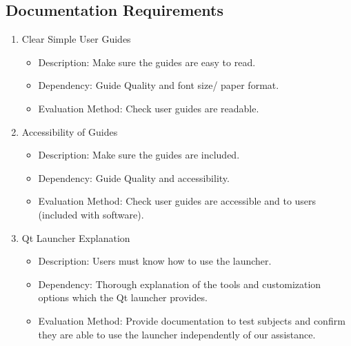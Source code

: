 \documentclass[a4paper,10pt]{article}
\begin{document}
	\subsection{Documentation Requirements}
	\begin{enumerate}
	  \item Clear Simple User Guides
	  \begin{itemize}
	    \item Description: Make sure the guides are easy to read.
	    \item  Dependency: Guide Quality and font size/ paper format.
	    \item Evaluation Method: Check user guides are readable.
	  \end{itemize}
	\item Accessibility of Guides
	  \begin{itemize}
	    \item Description: Make sure the guides are included.
	    \item  Dependency: Guide Quality and accessibility.  
	    \item Evaluation Method: Check user guides are accessible and to users (included with software).
	  \end{itemize}
	\item Qt Launcher Explanation
	\begin{itemize}
			\item Description: Users must know how to use the launcher.
			\item  Dependency: Thorough explanation of the tools and customization options which the Qt launcher provides.  
			\item Evaluation Method: Provide documentation to test subjects and confirm they are able to use the launcher independently of our assistance.
	\end{itemize}
	\end{enumerate}

	
	
\pagebreak
\end{document}
